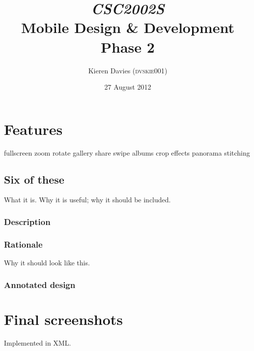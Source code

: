 \documentclass[a4paper]{article}
\begin{document}
\title{\emph{CSC2002S} \\
       Mobile Design \& Development \\
       Phase 2}
\author{Kieren Davies (\textsc{dvskie001})}
\date{27 August 2012}
\maketitle

\section{Features}

fullscreen
zoom
rotate
gallery
share
swipe
albums
crop
effects
panorama stitching

\subsection{Six of these}

What it is.  Why it is useful; why it should be included.

\subsubsection{Description}
\subsubsection{Rationale}
Why it should look like this.
\subsubsection{Annotated design}

\section{Final screenshots}

Implemented in XML.
\end{document}
